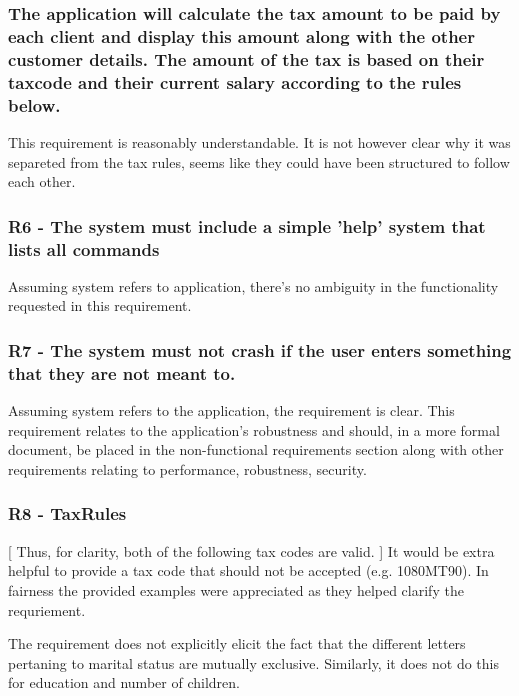 \subsubsection{ The application will calculate the tax amount to be paid by each client and display this amount along with the other customer details. The amount of the tax is based on their taxcode and their current salary according to the rules below.}

This requirement is reasonably understandable. It is not however clear why it was separeted from the tax rules, seems like they could have been structured to follow each other. 

\subsubsection{R6 -  The system must include a simple 'help' system that lists all commands}
Assuming system refers to application, there's no ambiguity in the functionality requested in this requirement. 

\subsubsection{R7 - The system must not crash if the user enters something that they are not meant to.}
Assuming system refers to the application, the requirement is clear. This requirement relates to the application's robustness and should, in a more formal document, be placed in the non-functional requirements section along with other requirements relating to performance, robustness, security. 

\subsubsection{R8 - TaxRules}
[ Thus, for clarity, both of the following tax codes are valid. ] 
It would be extra helpful to provide a tax code that should not be accepted (e.g. 1080MT90). In fairness the provided examples were appreciated as they helped clarify the requriement.

The requirement does not explicitly elicit the fact that the different letters pertaning to marital status are mutually exclusive. Similarly, it does not do this for education and number of children. 

